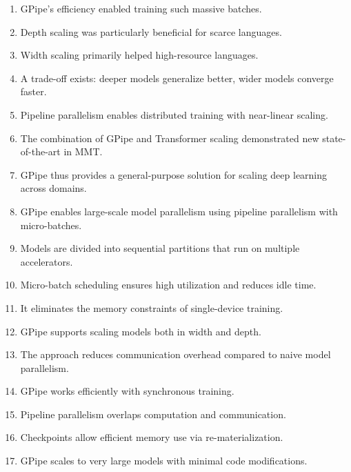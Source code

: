 \documentclass[12pt]{article}
\begin{document}
\begin{enumerate}
  \item GPipe’s efficiency enabled training such massive batches.  
  \item Depth scaling was particularly beneficial for scarce languages.  
  \item Width scaling primarily helped high-resource languages.  
  \item A trade-off exists: deeper models generalize better, wider models converge faster.  
  \item Pipeline parallelism enables distributed training with near-linear scaling.  
  \item The combination of GPipe and Transformer scaling demonstrated new state-of-the-art in MMT.  
  \item GPipe thus provides a general-purpose solution for scaling deep learning across domains.  


\item GPipe enables large-scale model parallelism using pipeline parallelism with micro-batches.  
\item Models are divided into sequential partitions that run on multiple accelerators.  
\item Micro-batch scheduling ensures high utilization and reduces idle time.  
\item It eliminates the memory constraints of single-device training.  
\item GPipe supports scaling models both in width and depth.  
\item The approach reduces communication overhead compared to naive model parallelism.  
\item GPipe works efficiently with synchronous training.  
\item Pipeline parallelism overlaps computation and communication.  
\item Checkpoints allow efficient memory use via re-materialization.  
\item GPipe scales to very large models with minimal code modifications.  



\end{enumerate}
\end{document}
